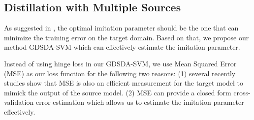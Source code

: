 \subsection{Distillation with Multiple Sources}
As suggested in \cite{vapnik2015learning}, the optimal imitation parameter should be the one that can minimize the training error on the target domain. Based on that, we propose our method GDSDA-SVM which can effectively estimate the imitation parameter.

Instead of using hinge loss in our GDSDA-SVM, we use Mean Squared Error (MSE) as our loss function for the following two reasons: (1) several recently studies \cite{ba2014deep,luo2016face,romero2014fitnets,urban2016deep} show that MSE is also an efficient measurement for the target model to mimick the output of the source model. (2) MSE can provide a closed form cross-validation error estimation which allows us to estimate the imitation parameter effectively. 

